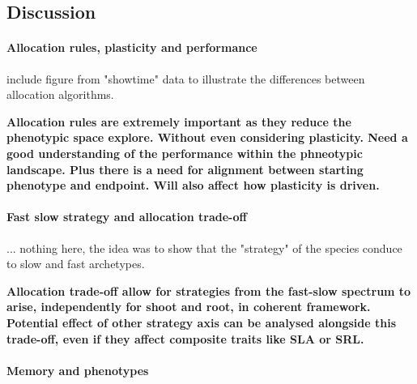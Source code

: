 \subsection{Discussion}
\paragraph{Allocation rules, plasticity and performance}

include figure from "showtime" data to illustrate the differences between allocation algorithms.

\textbf{Allocation rules are extremely important as they reduce the phenotypic space explore. Without even considering plasticity. Need a good understanding of the performance within the phneotypic landscape. Plus there is a need for alignment between starting phenotype and endpoint. Will also affect how plasticity is driven.}

\paragraph{Fast slow strategy and allocation trade-off}

... nothing here, the idea was to show that the "strategy" of the species conduce to slow and fast archetypes.

\textbf{Allocation trade-off allow for strategies from the fast-slow spectrum to arise, independently for shoot and root, in coherent framework. Potential effect of other strategy axis can be analysed alongside this trade-off, even if they affect composite traits like SLA or SRL.}

\paragraph{Memory and phenotypes}


